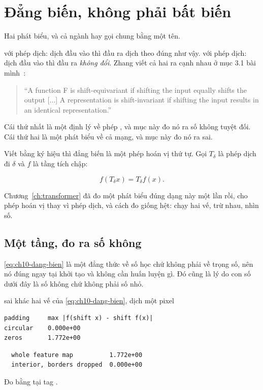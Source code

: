 \section{Đẳng biến, không phải bất biến}
\label{sec:ch10-dang-bien}

%
Hai phát biểu, và cả ngành hay gọi chung bằng một tên.

 với phép dịch: dịch đầu vào thì đầu ra dịch theo
đúng như vậy.  với phép dịch: dịch đầu vào thì đầu ra
\emph{không đổi}. Zhang viết cả hai ra cạnh nhau ở mục 3.1 bài
mình~\autocite{zhang2019shift}:

\begin{quote}
\enquote{A function F is shift-equivariant if shifting the input equally shifts
the output [...] A representation is shift-invariant if shifting the input
results in an identical representation.}
\end{quote}

Cái thứ nhất là một định lý về phép , và mục này đo
nó ra số không tuyệt đối. Cái thứ hai là một phát biểu về cả mạng, và mục này
đo nó ra sai.

Viết bằng ký hiệu thì đẳng biến là một phép hoán vị thứ tự. Gọi \(T_\delta\) là
phép dịch đi \(\delta\) và \(f\) là tầng tích chập:

\begin{equation}
\label{eq:ch10-dang-bien}
f(T_\delta x) = T_\delta f(x).
\end{equation}

Chương~\ref{ch:transformer} đã đo một phát biểu đúng dạng này một lần rồi, cho
phép hoán vị thay vì phép dịch, và cách đo giống hệt: chạy hai vế, trừ nhau,
nhìn số.

\subsection*{Một tầng, đo ra số không}

%
\eqref{eq:ch10-dang-bien} là một đẳng thức về số học chứ không phải về trọng
số, nên nó đúng ngay tại khởi tạo và không cần huấn luyện gì. Đó cũng là lý do
con số dưới đây là số không chứ không phải số nhỏ.

\begin{measured}{sai khác hai vế của \eqref{eq:ch10-dang-bien}, dịch một pixel}
\begin{verbatim}
padding     max |f(shift x) - shift f(x)|
circular    0.000e+00
zeros       1.772e+00
\end{verbatim}

\begin{verbatim}
  whole feature map          1.772e+00
  interior, borders dropped  0.000e+00
\end{verbatim}

Đo bằng  tại tag .
\end{measured}

